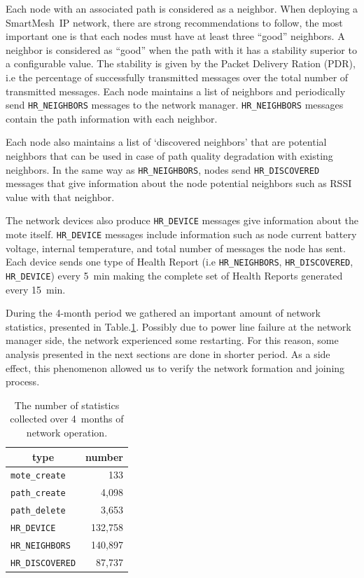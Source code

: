 \documentclass{sig-alternate}
\newcommand{\smip}                     {SmartMesh~IP\xspace}
\newcommand{\HRNEIGHBORS}              {{\tt HR\_NEIGHBORS}\xspace}
\newcommand{\HRDISCOVERED}             {{\tt HR\_DISCOVERED}\xspace}
\newcommand{\HRDEVICE}                 {{\tt HR\_DEVICE}\xspace}
\newcommand{\pathcreate}               {{\tt path\_create}\xspace}
\newcommand{\pathdelete}               {{\tt path\_delete}\xspace}
\newcommand{\motecreate}               {{\tt mote\_create}\xspace}
\newcommand{\HRNEIGHBORSTOTALNUMBER}   {140,897}
\begin{document}

Each node with an associated path is considered as a neighbor.
When deploying a \smip network, there are strong recommendations to follow, the most important one is that each nodes must have at least three ``good'' neighbors.
A neighbor is considered as ``good'' when the path with it has a stability superior to a configurable value.
The stability is given by the Packet Delivery Ration (PDR), i.e the percentage of successfully transmitted messages over the total number of transmitted messages.
Each node maintains a list of neighbors and periodically send \HRNEIGHBORS messages to the network manager.
\HRNEIGHBORS messages contain the path information with each neighbor.


Each node also maintains a list of `discovered neighbors' that are potential neighbors that can be used in case of path quality degradation with existing neighbors.
In the same way as \HRNEIGHBORS, nodes send \HRDISCOVERED messages that give information about the node potential neighbors such as RSSI value with that neighbor.


The network devices also produce \HRDEVICE messages give information about the mote itself.
\HRDEVICE messages include information such as node current battery voltage, internal temperature, and total number of messages the node has sent.
Each device sends one type of Health Report (i.e \HRNEIGHBORS, \HRDISCOVERED, \HRDEVICE) every 5~min making the complete set of Health Reports generated every 15~min.


During the 4-month period we gathered an important amount of network statistics, presented in Table.\ref{tab:msg_stats}.
Possibly due to power line failure at the network manager side, the network experienced some restarting.
For this reason, some analysis presented in the next sections are done in shorter period.
As a side effect, this phenomenon allowed us to verify the network formation and joining process.

\begin{table}
    \centering
    \begin{tabular}{|l|r|}
        \hline
        \multicolumn{1}{|c|}{type} & \multicolumn{1}{|c|}{number} \\ \hline
        \hline
        \motecreate     &     133 \\ \hline
        \pathcreate     &   4,098 \\ \hline
        \pathdelete     &   3,653 \\ \hline
        \HRDEVICE       & 132,758 \\ \hline
        \HRNEIGHBORS    & \HRNEIGHBORSTOTALNUMBER \\ \hline
        \HRDISCOVERED   &  87,737 \\ \hline
    \end{tabular}
    \caption{The number of statistics collected over 4~months of network operation.}
    \label{tab:msg_stats}
\end{table}
\end{document}

